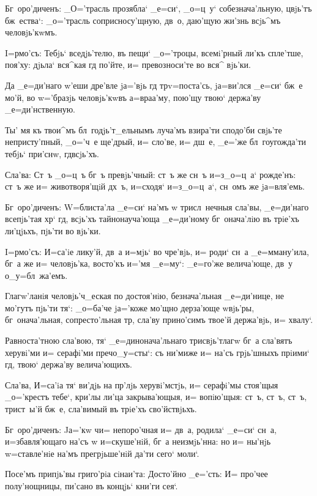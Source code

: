 Бг~оро'диченъ: _О='трасль прозябла` _е=си`, _о=ц~у` 
собезнача'льную, цвjь'тъ бж~ества`: _о='трасль 
соприсносу'щную, дв~о, даю'щую жи'знь всjь^мъ 
человjь'кwмъ.


I=рмо'съ: Тебjь` вседjь'телю, въ пещи` _о='троцы, 
всемi'рный ли'къ спле'тше, поя'ху: дjьла` вся^кая гд 
по'йте, и= превозноси'те во вся^ вjь'ки.

Да _е=ди'наго w'еши дре'вле jа='вjь гд 
тр v=поста'сь, jа=ви'лся _е=си` бж~е мо'й, во 
w='бразjь человjь'кwвъ а=враа'му, пою'щу твою` держа'ву 
_е=ди'нственную.

Ты' мя къ твои^мъ бл~годjь'т_ельнымъ луча'мъ взира'ти 
сподо'би свjь'те непристу'пный, _о='ч~е ще'дрый, и= 
сло'ве, и= дш~е, _е='же бл~гоугожда'ти тебjь` при'снw, 
гд всjь'хъ.

Сла'ва: Ст~ъ _о=ц~ъ бг~ъ превjь'чный: ст~ъ же сн~ъ 
и=з\ъ _о=ц~а` рожде'нъ: ст~ъ же и= животворя'щiй дх~ъ, 
и=сходя` и=з\ъ _о=ц~а`, сн~омъ же jа=вля'емь.

Бг~оро'диченъ: W=блиста'ла _е=си` на'мъ w\т 
трисл~нечныя сла'вы, _е=ди'наго всепjь'тая хр` гд, 
всjь'хъ тайнонауча'юща _е=ди'ному бг~онача'лiю въ трiе'хъ 
ли'цjьхъ, пjь'ти во вjь'ки.


I=рмо'съ: И=са'iе лику'й, дв~а и=мjь` во чре'вjь, и= 
роди` сн~а _е=мману'ила, бг~а же и= человjь'ка, восто'къ 
и='мя _е=му`: _е=го'же велича'юще, дв~у о_у=бл~жа'емъ.

Глагw'ланiя человjь'ч_еская по достоя'нiю, 
безнача'льная _е=ди'нице, не мо'гутъ пjь'ти тя`: _о=ба'че 
jа='коже мо'щно дерза'юще w\т вjь'ры, бг~онача'льная, 
сопресто'льная тр, сла'ву прино'симъ твое'й 
держа'вjь, и= хвалу`.

Равноста'тною сла'вою, тя` _е=динонача'льнаго 
трисвjь'тлагw бг~а сла'вятъ херувi'ми и= серафi'ми 
преч о_у=сты`: съ ни'миже и= на'съ грjь'шныхъ 
прiими` гд, твою` держа'ву велича'ющихъ. 

Сла'ва, И=са'iа тя` ви'дjь на пр'лjь херувi'мстjь, 
и= серафi'мы стоя'щыя _о='крестъ тебе`, кри'лы ли'ца 
закрыва'ющыя, и= вопiю'щыя: ст~ъ, ст~ъ, ст~ъ, трист~ы'й 
бж~е, сла'вимый въ трiе'хъ сво'йствjьхъ.

Бг~оро'диченъ: Jа='кw ч и= непоро'чная и= дв~а, 
родила` _е=си` сн~а, и=збавля'ющаго на'съ w\т 
и=скуше'нiй, бг~а неизмjь'нна: но и= ны'нjь w=ставле'нiе 
на'мъ прегрjьше'нiй да'ти сего` моли`. 

Посе'мъ припjь'вы григо'рiа сiнаи'та: Досто'йно 
_е='сть: И= про'чее полу'нощницы, пи'сано въ концjь` 
кни'ги сея`.
